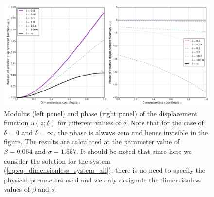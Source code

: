 \documentclass{svjour3}                     %
\begin{document}
\begin{figure}[!htbp]
    \centering
    \includegraphics[width=\textwidth]{./img_eig_asy/fig_sol_analytic_disp_fun.jpg}
    \caption{Modulus (left panel) and phase (right panel) of the displacement function $u(z;\delta)$ for different values of $\delta$. Note that for the case of $\delta = 0$ and $\delta = \infty$, the phase is always zero and hence invisible in the figure. The results are calculated at the parameter value of $\beta = 0.064$ and $\sigma = 1.557$. It should be noted that since here we consider the solution for the system (\ref{eq:eq_dimensionless_system_all}), there is no need to specify the physical parameters used and we only designate the dimensionless values of $\beta $ and $\sigma $.}
    \label{fig:fig_sol_analytic_disp_fun}
\end{figure}
\end{document}
